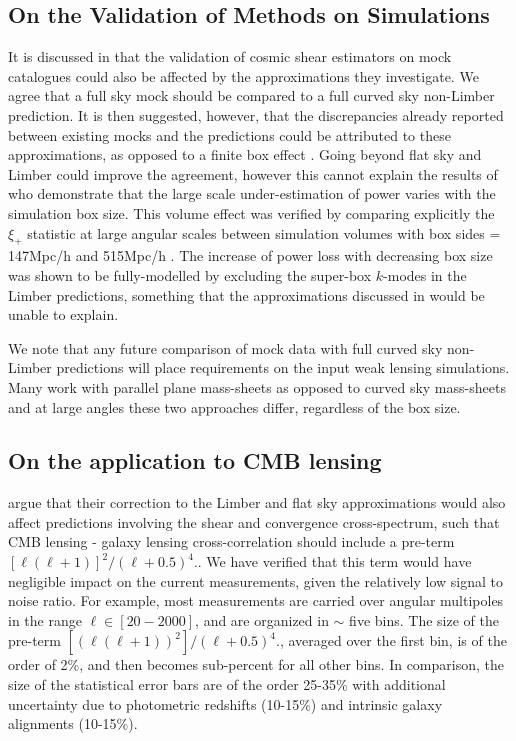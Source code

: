\subsection{On the Validation of Methods on Simulations}
It is discussed in \citet{kitching/etal:2016} that the validation of cosmic shear estimators on mock catalogues could also be affected by the approximations they investigate.  We agree that a full sky mock should be compared to a full curved sky non-Limber prediction.  It is then suggested, however, that the discrepancies already reported between existing mocks and the predictions could be attributed to these approximations, as opposed to a finite box effect \citep{kiessling/etal:2011, harnois-deraps/etal:2012, harnois-deraps/vanwaerbeke:2015}.  Going beyond flat sky and Limber could improve the agreement, however this cannot explain the results of \citet{harnois-deraps/vanwaerbeke:2015} who demonstrate that the large scale under-estimation of power varies with the simulation box size. This volume effect was verified by comparing explicitly the $\xi_+$ statistic at large angular scales between simulation volumes with box sides = 147Mpc/h and 515Mpc/h \citep[see Fig. 5 in][]{harnois-deraps/vanwaerbeke:2015}. The increase of power loss with decreasing box size was shown to be fully-modelled by excluding the super-box $k$-modes in the Limber predictions, something that the approximations discussed in \citet{kitching/etal:2016} would be unable to explain.

We note that any future comparison of mock data with full curved sky non-Limber predictions will place requirements on the input weak lensing simulations.  Many work with parallel plane mass-sheets as opposed to curved sky mass-sheets and at large angles these two approaches differ, regardless of the box size. 

\subsection{On the application to CMB lensing}
\citet{kitching/etal:2016} argue that their correction to the Limber and flat sky approximations would also affect predictions involving the shear and convergence cross-spectrum, such that CMB lensing - galaxy lensing cross-correlation should include a pre-term $ [\ell(\ell+1)]^2/(\ell+ 0.5)^4.$.   We have verified that this term would have negligible impact on the current measurements, given the relatively low signal to noise ratio. For example, most measurements \citep{hand/etal:2015, liu/hill:2015, kirk/etal:2016,harnois-deraps/etal:2016} are carried over angular multipoles in the range $\ell \in [20-2000]$, and are organized in $\sim$ five bins. The size of the pre-term $ [(\ell(\ell+1))^2]/(\ell+ 0.5)^4.$, averaged over the first bin, is of the order of 2\%, and then becomes sub-percent for all other bins. In comparison, the size of the statistical error bars are of the order 25-35\% with additional uncertainty due to photometric redshifts (10-15\%) and intrinsic galaxy alignments (10-15\%).





